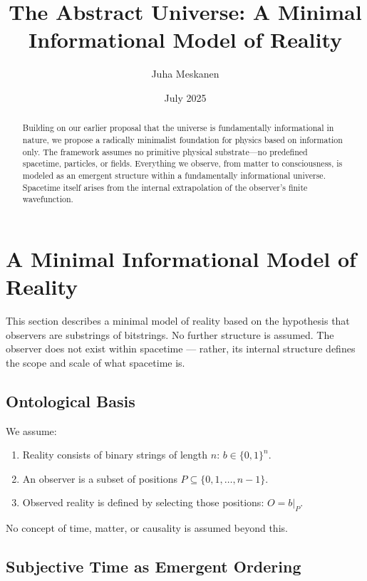 \documentclass[11pt]{article}
\title{The Abstract Universe: A Minimal Informational Model of Reality}
\author{Juha Meskanen}
\date{July 2025}
\begin{document}
\maketitle


\begin{abstract}
    Building on our earlier proposal that the universe is fundamentally informational in nature,
    we propose a radically minimalist foundation for physics based on information only.
    The framework assumes no primitive physical substrate—no predefined spacetime, particles, or fields.
    Everything we observe, from matter to consciousness, is modeled as an emergent structure within a fundamentally informational universe.
    Spacetime itself arises from the internal extrapolation of the observer’s finite wavefunction.
\end{abstract}

\section{A Minimal Informational Model of Reality}

This section describes a minimal model of reality based on the hypothesis that observers are substrings of bitstrings. No further structure is assumed.
The observer does not exist within spacetime — rather, its internal structure defines the scope and scale of what spacetime is.

\subsection{Ontological Basis}

We assume:

\begin{enumerate}
    \item Reality consists of binary strings of length $n$: $b \in \{0,1\}^n$.
    \item An observer is a subset of positions $P \subseteq \{0,1,\dots,n-1\}$.
    \item Observed reality is defined by selecting those positions: $O = b|_P$.
\end{enumerate}

No concept of time, matter, or causality is assumed beyond this.

\subsection{Subjective Time as Emergent Ordering}
\end{document}
